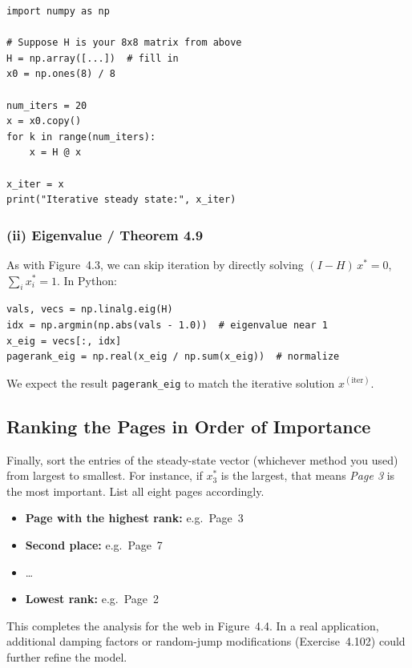 \documentclass{article}
\begin{document}
\begin{verbatim}
import numpy as np

# Suppose H is your 8x8 matrix from above
H = np.array([...])  # fill in
x0 = np.ones(8) / 8

num_iters = 20
x = x0.copy()
for k in range(num_iters):
    x = H @ x

x_iter = x
print("Iterative steady state:", x_iter)
\end{verbatim}

\subsubsection{(ii) Eigenvalue / Theorem 4.9}
As with Figure~4.3, we can skip iteration by directly solving 
$(I - H)\,x^* = 0$, $\sum_i x_i^*=1$. In Python:

\begin{verbatim}
vals, vecs = np.linalg.eig(H)
idx = np.argmin(np.abs(vals - 1.0))  # eigenvalue near 1
x_eig = vecs[:, idx]
pagerank_eig = np.real(x_eig / np.sum(x_eig))  # normalize
\end{verbatim}

We expect the result \verb|pagerank_eig| to match the iterative solution $x^{(\text{iter})}$.

\subsection{Ranking the Pages in Order of Importance}
Finally, sort the entries of the steady-state vector (whichever method you used) from 
largest to smallest. For instance, if $x^*_3$ is the largest, that means \emph{Page 3} 
is the most important. List all eight pages accordingly.

\begin{itemize}
  \item \textbf{Page with the highest rank:} e.g.\ Page~3
  \item \textbf{Second place:} e.g.\ Page~7
  \item \dots
  \item \textbf{Lowest rank:} e.g.\ Page~2
\end{itemize}

\noindent
This completes the analysis for the web in Figure~4.4. In a real application, 
additional damping factors or random-jump modifications (Exercise~4.102) could 
further refine the model.



\end{document}
